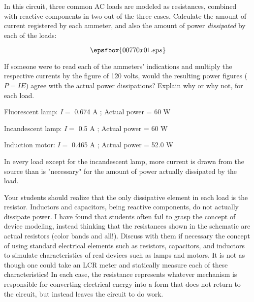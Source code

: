 

In this circuit, three common AC loads are modeled as resistances, combined with reactive components in two out of the three cases.  Calculate the amount of current registered by each ammeter, and also the amount of power {\it dissipated} by each of the loads:

$$\epsfbox{00770x01.eps}$$

If someone were to read each of the ammeters' indications and multiply the respective currents by the figure of 120 volts, would the resulting power figures ($P = I E$) agree with the actual power dissipations?  Explain why or why not, for each load.







Fluorescent lamp: $I =$ 0.674 A ; Actual power = 60 W

\vskip 10pt

Incandescent lamp: $I =$ 0.5 A ; Actual power = 60 W

\vskip 10pt

Induction motor: $I =$ 0.465 A ; Actual power = 52.0 W

\vskip 10pt

In every load except for the incandescent lamp, more current is drawn from the source than is "necessary" for the amount of power actually dissipated by the load.







Your students should realize that the only dissipative element in each load is the resistor.  Inductors and capacitors, being reactive components, do not actually dissipate power.  I have found that students often fail to grasp the concept of device modeling, instead thinking that the resistances shown in the schematic are actual resistors (color bands and all!).  Discuss with them if necessary the concept of using standard electrical elements such as resistors, capacitors, and inductors to simulate characteristics of real devices such as lamps and motors.  It is not as though one could take an LCR meter and statically measure each of these characteristics!  In each case, the resistance represents whatever mechanism is responsible for converting electrical energy into a form that does not return to the circuit, but instead leaves the circuit to do work.

